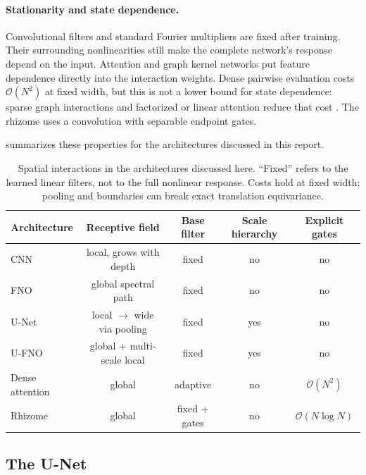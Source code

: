\paragraph{Stationarity and state dependence.} Convolutional filters and standard Fourier multipliers are fixed after training. Their surrounding nonlinearities still make the complete network's response depend on the input. Attention \citep{vaswani2017attention} and graph kernel networks \citep{li2020graph} put feature dependence directly into the interaction weights. Dense pairwise evaluation costs $\mathcal{O}(N^2)$ at fixed width, but this is not a lower bound for state dependence: sparse graph interactions and factorized or linear attention reduce that cost \citep{katharopoulos2020linear}. The rhizome uses a convolution with separable endpoint gates.

 summarizes these properties for the architectures discussed in this report.

\begin{table}[!tp]
  \centering
  \caption{Spatial interactions in the architectures discussed here. ``Fixed'' refers to the learned linear filters, not to the full nonlinear response. Costs hold at fixed width; pooling and boundaries can break exact translation equivariance.}
  \label{tab:inductive-biases}
  \begin{tabular}{lcccc}
    \toprule
    Architecture & Receptive field & Base filter & Scale hierarchy & Explicit gates \\
    \midrule
    CNN          & local, grows with depth   & fixed & no  & no \\
    FNO          & global spectral path     & fixed & no  & no \\
    U-Net        & local $\to$ wide via pooling & fixed & yes & no \\
    U-FNO        & global + multi-scale local & fixed & yes & no \\
    Dense attention & global                  & adaptive & no & $\mathcal{O}(N^2)$ \\
    Rhizome      & global                    & fixed + gates & no & $\mathcal{O}(N\log N)$ \\
    \bottomrule
  \end{tabular}
\end{table}

\subsection{The U-Net}
\label{sec:unet}

